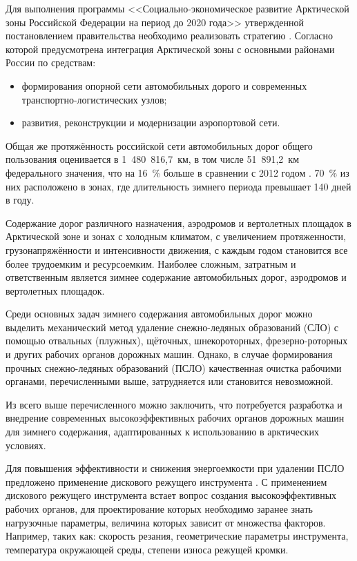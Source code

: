 {\actuality} Для выполнения программы <<Социально-экономическое развитие Арктической зоны Российской Федерации на период до 2020 года>> утвержденной постановлением правительства \cite{PostRF} необходимо реализовать стратегию \cite{Strategi}. Согласно которой предусмотрена интеграция Арктической зоны с основными районами России по средствам: 
\begin{itemize}
	\item формирования опорной сети автомобильных дорого и современных транспортно-логистических узлов;
	\item развития, реконструкции и модернизации аэропортовой сети.
\end{itemize}

Общая же протяжённость российской сети автомобильных дорог общего пользования оценивается в 1~480~816,7~км, в том числе 51~891,2~км федерального значения, что на 16~\% больше в сравнении с 2012 годом \cite{StatL}. 70~\% из них расположено в зонах, где длительность зимнего периода превышает 140 дней в году.

Содержание дорог различного назначения, аэродромов и вертолетных площадок в Арктической зоне и зонах с холодным климатом, с увеличением протяженности, грузонапряжённости и интенсивности движения, с каждым годом становится все более трудоемким и ресурсоемким. Наиболее сложным, затратным и ответственным является зимнее содержание автомобильных дорог, аэродромов и вертолетных площадок. 

Среди основных задач зимнего содержания автомобильных дорог можно выделить механический метод удаление снежно-ледяных образований (СЛО) с помощью отвальных (плужных), щёточных, шнекороторных, фрезерно-роторных и других рабочих органов дорожных машин. Однако, в случае формирования прочных снежно-ледяных образований (ПСЛО) качественная очистка рабочими органами, перечисленными выше, затрудняется или становится невозможной.

Из всего выше перечисленного можно заключить, что потребуется разработка и внедрение современных высокоэффективных рабочих органов дорожных машин для зимнего содержания, адаптированных к использованию в арктических условиях.

Для повышения эффективности и снижения энергоемкости при удалении ПСЛО предложено применение дискового режущего инструмента \cite{GanjaDRI, GanjaPSLO, WorkOrgan}. С применением дискового режущего инструмента встает вопрос создания высокоэффективных рабочих органов, для проектирование которых необходимо заранее знать нагрузочные параметры, величина которых зависит от множества факторов. Например, таких как: скорость резания, геометрические параметры инструмента, температура окружающей среды, степени износа режущей кромки.

